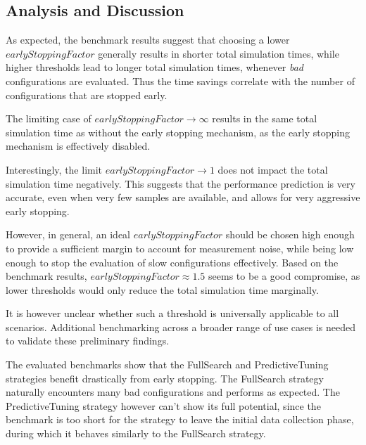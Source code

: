 \documentclass[conference]{IEEEtran}
\begin{document}
\subsection{Analysis and Discussion}
\begin{description}[leftmargin=1.2em, font=\itshape, style=nextline]
    \item[Early Stopping Factor:]
        As expected, the benchmark results suggest that choosing a lower $earlyStoppingFactor$ generally results in shorter total simulation times, while higher thresholds lead to longer total simulation times, whenever \textit{bad} configurations are evaluated. Thus the time savings correlate with the number of configurations that are stopped early.

        The limiting case of $earlyStoppingFactor \rightarrow \infty$ results in the same total simulation time as without the early stopping mechanism, as the early stopping mechanism is effectively disabled.

        Interestingly, the limit $earlyStoppingFactor \rightarrow 1$ does not impact the total simulation time negatively. This suggests that the performance prediction is very accurate, even when very few samples are available, and allows for very aggressive early stopping.

        However, in general, an ideal $earlyStoppingFactor$ should be chosen high enough to provide a sufficient margin to account for measurement noise, while being low enough to stop the evaluation of slow configurations effectively. Based on the benchmark results, $earlyStoppingFactor \approx 1.5$ seems to be a good compromise, as lower thresholds would only reduce the total simulation time marginally.

        It is however unclear whether such a threshold is universally applicable to all scenarios. Additional benchmarking across a broader range of use cases is needed to validate these preliminary findings.

    \item[Effect on Tuning Strategies:]
        The evaluated benchmarks show that the FullSearch and PredictiveTuning strategies benefit drastically from early stopping. The FullSearch strategy naturally encounters many bad configurations and performs as expected. The PredictiveTuning strategy however can't show its full potential, since the benchmark is too short for the strategy to leave the initial data collection phase, during which it behaves similarly to the FullSearch strategy.


\end{description}
\end{document}
